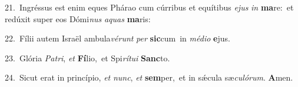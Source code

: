 {\numbfont\textcolor{\numbcolor}{21.}}~Ingréssus est enim eques Phárao cum cúrribus et equítibus \textit{e}\-\textit{jus} \textit{in} \textbf{ma}\-re:~\star et redúxit super eos Dómi\textit{nus} \textit{a}\-\textit{quas} \textbf{ma}\-ris:\par
{\numbfont\textcolor{\numbcolor}{22.}}~Fílii autem Israël ambula\-\textit{vé}\-\textit{runt} \textit{per} \textbf{sic}\-cum~\star in \textit{mé}\-\textit{di}\textit{o} \textbf{e}\-jus.\par
{\numbfont\textcolor{\numbcolor}{23.}}~Glória \textit{Pa}\-\textit{tri}, \textit{et} \textbf{Fí}\-lio,~\star et Spi\-\textit{rí}\-\textit{tu}\textit{i} \textbf{Sanc}\-to.\par
{\numbfont\textcolor{\numbcolor}{24.}}~Sicut erat in princípio, \textit{et} \textit{nunc}\-, \textit{et} \textbf{sem}\-per,~\star et in sǽcula sæ\-\textit{cu}\-\textit{ló}\textit{rum}. \textbf{A}\-men.\par
